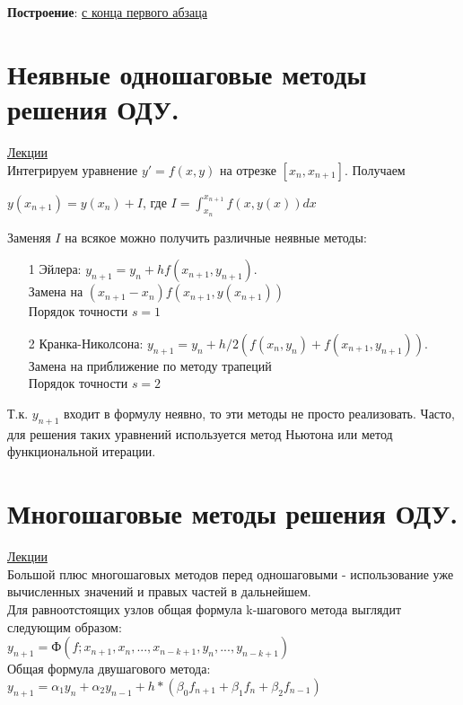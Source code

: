\documentclass[specialist, subf, href, colorlinks=true, 12pt, times, mtpro, final]{disser}
\theoremstyle{definition}
\begin{document}
{    \textbf{Построение}: \hyperlink {lects.89}{с конца первого абзаца}\\

\section {Неявные одношаговые методы решения ОДУ.}
    \hyperlink {lects.91}{Лекции}\\
    Интегрируем уравнение $y' = f (x,y)$ на отрезке $[x_n, x_{n+1}]$. Получаем
    \begin{center}
    $y(x_{n+1}) = y (x_n) + I$, где $I = \int^{x_{n+1}}_{x_n} f(x,y(x))dx$
    \end{center}
    Заменяя $I$ на всякое можно получить различные неявные методы:
    \begin{itemize}
    \item[1] Эйлера: $y_{n+1} = y_n + hf(x_{n+1}, y_{n+1})$. \\
    Замена на $(x_{n+1}-x_n)f(x_{n+1}, y(x_{n+1}))$\\
    Порядок точности $s=1$\\
    
    
    \item[2] Кранка-Николсона: $y_{n+1} = y_n + h/2(f(x_n,y_n) + f(x_{n+1}, y_{n+1}))$. \\
    Замена на приближение по методу трапеций\\
    Порядок точности $s=2$\\
    
    \end{itemize}
    
    Т.к. $y_{n+1}$ входит в формулу неявно, то эти методы не просто реализовать.  Часто, для решения таких уравнений используется метод Ньютона или метод функциональной итерации.
    

\section {Многошаговые методы решения ОДУ.}
    \hyperlink {lects.92}{Лекции}\\
    Большой плюс многошаговых методов перед одношаговыми - использование уже вычисленных значений и правых частей в дальнейшем.\\
    Для равноотстоящих узлов общая формула k-шагового метода выглядит следующим образом:\\
    $y_{n+1} = Ф(f;x_{n+1},x_n,...,x_{n-k+1},y_n,...,y_{n-k+1})$\\
    Общая формула двушагового метода:\\
    $y_{n+1} = \alpha_1y_n +\alpha_2y_{n-1} + h*(\beta_0f_{n+1} + \beta_1f_n + \beta_2f_{n-1})$\\ 
    
}
\end{document}

